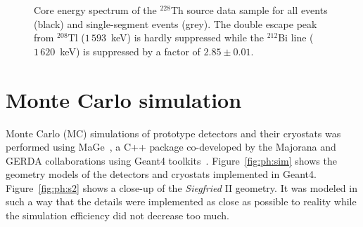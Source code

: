 \begin{figure}[htbp]
\centering
{}%
%
\caption{Core energy spectrum of the $^{228}$Th source data sample for all events (black) and single-segment events (grey). The double escape peak from $^{208}$Tl ($1\,593$~keV) is hardly suppressed while the $^{212}$Bi line ($1\,620$~keV) is suppressed by a factor of $2.85 \pm 0.01$.}
\label{fig:ph:seg}
\end{figure}

\section{Monte Carlo simulation}
\label{sec:ph:sim}
Monte Carlo (MC) simulations of prototype detectors and their cryostats was performed using MaGe~\cite{Mag08}, a C++ package co-developed by the Majorana and GERDA collaborations using Geant4 toolkits~\cite{Gea03,Gea06}. Figure~\ref{fig:ph:sim} shows the geometry models of the detectors and cryostats implemented in Geant4.
Figure~\ref{fig:ph:s2} shows a close-up of the \emph{Siegfried} II geometry. It was modeled in such a way that the details were implemented as close as possible to reality while the simulation efficiency did not decrease too much.

